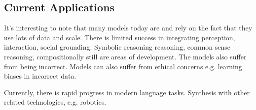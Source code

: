 \subsection{Current Applications}

It's interesting to note that many models today are  and rely on the fact that they use lots of data and scale. There is limited success in integrating perception, interaction, social grounding. Symbolic reasoning reasoning, common sense reasoning, compositionally still are areas of development. The models also suffer from being incorrect. Models can also suffer from ethical concerns e.g. learning biases in incorrect data.

Currently, there is rapid progress in modern language tasks. Synthesis with other related technologies, e.g. robotics.